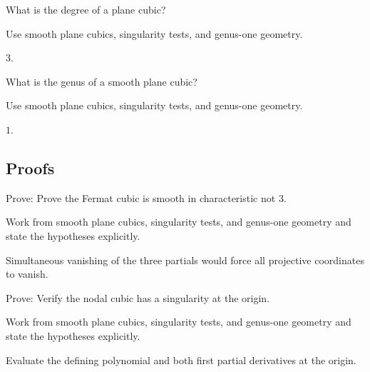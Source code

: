 \begin{exercise}[Degree]\label{exr:vi43-expand-04}
What is the degree of a plane cubic?
\end{exercise}
\begin{hint}
Use smooth plane cubics, singularity tests, and genus-one geometry.
\end{hint}
\begin{solution}
$3$.
\end{solution}

\begin{exercise}[Genus]\label{exr:vi43-expand-05}
What is the genus of a smooth plane cubic?
\end{exercise}
\begin{hint}
Use smooth plane cubics, singularity tests, and genus-one geometry.
\end{hint}
\begin{solution}
$1$.
\end{solution}

\subsection*{Proofs}

\begin{exercise}\label{exr:vi43-expand-06}
Prove: Prove the Fermat cubic is smooth in characteristic not $3$.
\end{exercise}
\begin{hint}
Work from smooth plane cubics, singularity tests, and genus-one geometry and state the hypotheses explicitly.
\end{hint}
\begin{solution}
Simultaneous vanishing of the three partials would force all projective coordinates to vanish.
\end{solution}

\begin{exercise}\label{exr:vi43-expand-07}
Prove: Verify the nodal cubic has a singularity at the origin.
\end{exercise}
\begin{hint}
Work from smooth plane cubics, singularity tests, and genus-one geometry and state the hypotheses explicitly.
\end{hint}
\begin{solution}
Evaluate the defining polynomial and both first partial derivatives at the origin.
\end{solution}

